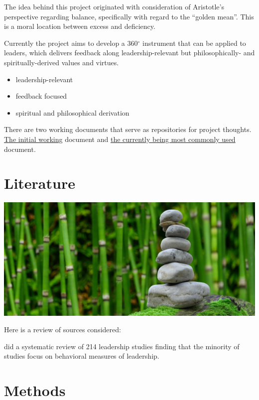 \documentclass[
]{book}
\providecommand{\tightlist}{%
  \setlength{\itemsep}{0pt}\setlength{\parskip}{0pt}}
\begin{document}
The idea behind this project originated with consideration of Aristotle's perspective regarding balance, specifically with regard to the ``golden mean''. This is a moral location between excess and deficiency.

Currently the project aims to develop a 360\(^{\circ}\) instrument that can be applied to leaders, which delivers feedback along leadership-relevant but philosophically- and spiritually-derived values and virtues.

\begin{itemize}
\tightlist
\item
  leadership-relevant
\item
  feedback focused
\item
  spiritual and philosophical derivation
\end{itemize}

There are two working documents that serve as repositories for project thoughts. \href{https://docs.google.com/document/d/1p81MrX7OqYGDXCxKIOJcDu0b73kf9YULHpWYhjWS0dI/edit?usp=sharing}{The initial working} document and \href{https://docs.google.com/document/d/1eRxcsNCrdmKVSGAQuriNUAjPG9SuAJ_q/edit?usp=sharing\&ouid=106149280369729835297\&rtpof=true\&sd=true}{the currently being most commonly used} document.

\hypertarget{literature}{%
\chapter{Literature}\label{literature}}

\includegraphics{stones-ge8c321976_1920.jpg}

Here is a review of sources considered:

\citet{banks2021behavior} did a systematic review of 214 leadership studies finding that the minority of studies focus on behavioral measures of leadership.

\hypertarget{methods}{%
\chapter{Methods}\label{methods}}
\end{document}
